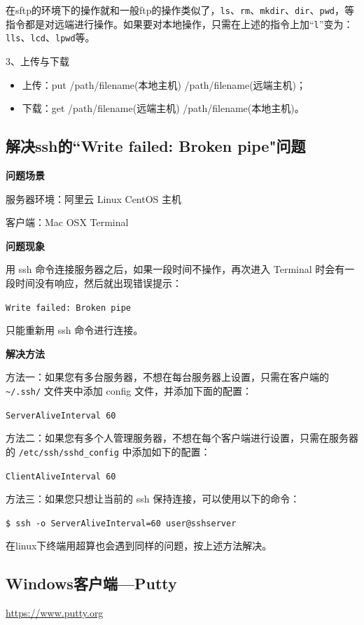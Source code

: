 {在sftp的环境下的操作就和一般ftp的操作类似了，\verb|ls|、\verb|rm|、\verb|mkdir|、\verb|dir|、\verb|pwd|，等指令都是对远端进行操作。如果要对本地操作，只需在上述的指令上加“\verb|l|”变为：\verb|lls|、\verb|lcd|、\verb|lpwd|等。

3、上传与下载

\begin{itemize}
\item 上传：put /path/filename(本地主机) /path/filename(远端主机)；
\item 下载：get /path/filename(远端主机) /path/filename(本地主机)。
\end{itemize}



\subsection{解决ssh的``Write failed: Broken pipe"问题}

\textbf{问题场景}

服务器环境：阿里云 Linux CentOS 主机

客户端：Mac OSX Terminal

\textbf{问题现象}

用 ssh 命令连接服务器之后，如果一段时间不操作，再次进入 Terminal 时会有一段时间没有响应，然后就出现错误提示：

\verb|Write failed: Broken pipe|

只能重新用 ssh 命令进行连接。

\textbf{解决方法}

方法一：如果您有多台服务器，不想在每台服务器上设置，只需在客户端的 \verb*|~/.ssh/| 文件夹中添加 config 文件，并添加下面的配置：

\verb*|ServerAliveInterval 60|

方法二：如果您有多个人管理服务器，不想在每个客户端进行设置，只需在服务器的 \verb*|/etc/ssh/sshd_config| 中添加如下的配置：

\verb*|ClientAliveInterval 60|

方法三：如果您只想让当前的 ssh 保持连接，可以使用以下的命令：

\verb*|$ ssh -o ServerAliveInterval=60 user@sshserver|


在linux下终端用超算也会遇到同样的问题，按上述方法解决。


\subsection{Windows客户端—Putty}
\url{https://www.putty.org}

}
